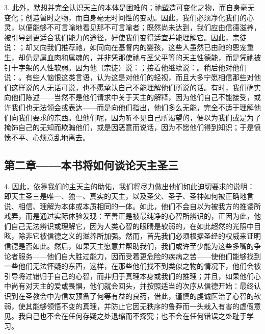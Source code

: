 3. 此外，默想并完全认识天主的本体是困难的；祂塑造可变化之物，而自身毫无变化；创造暂时之物，而自身毫无时间性的变动。因此，我们必须净化我们的心灵，以便能够不可言喻地看见那不可言喻者；既然尚未达到，我们应由信德滋养，被引导到更适合我们能力的途径，好使我们变得适宜并能理解它。因此，宗徒说：；却又向我们推荐祂，如同向在基督内的婴孩，这些人虽然已由祂的恩宠重生，却仍是属血肉和属魂的，并非凭那使祂与圣父平等的天主性德能，而是凭祂被钉十字架的人性软弱。因为他（宗徒）说：；接着他继续说：。稍后他对他们说：。有些人恼恨这类言语，认为这是对他们的轻视，而且大多宁愿相信那些对他们这样说的人无话可说，也不愿承认自己不能理解他们所说的话。有时，我们确实向他们陈述——当然不是他们请求中关于天主的解释，因为他们自己不能接受，或许我们也无法领会或表达——而是向他们指出，他们多么无能，完全不适于理解他们向我们要求的东西。但他们呢，因为听不见自己所渴望的，便以为我们或是为了掩饰自己的无知而欺骗他们，或是因恶意而说话，因为不愿他们得到知识；于是愤愤不平、心烦意乱地离去。\par


\subsection{第二章——本书将如何谈论天主圣三}

4. 因此，依靠我们的主天主的助佑，我们将尽力做出他们如此迫切要求的说明：即天主圣三是唯一、独一、真实的天主，以及圣父、圣子、圣神如何被正确地言说、相信、理解为本体或本质相同的一体。如此，他们不会自以为被我方的推诿所戏弄，而是通过实际体验发现：至善正是被最纯净的心智所辨识的，正因为此，他们自己无法辨识或理解它，因为人类心智的眼睛是软弱的，在如此超然的光照中目眩，除非它被信德之义的滋养所加强。然而，首先我们必须根据圣经的权威来证明信德是否如此。然后，如果天主愿意并帮助我们，我们或许至少能为这些多嘴的争论者服务——他们自大胜过能力，因而受着更危险的疾病之苦——使他们能够找到一些他们无法怀疑的东西，这样，在那些他们找不到类似之物的情况下，他们会被引导将过错归于自己的心智，而非归于真理本身或我们的推理；并且，如果他们心中尚有对天主的爱或畏惧，他们就会回头，并按照适当的次序从信德开始：最终认识到在圣教会中为信友预备了何等有益的良药，借此，谨慎的虔诚医治了心智的软弱，使其能够领悟不变的真理，并防止它因无秩序的鲁莽而一头栽入有害的虚假意见。我自己也不会在任何存疑之处退缩而不探究；也不会在任何错误之处耻于学习。\par

